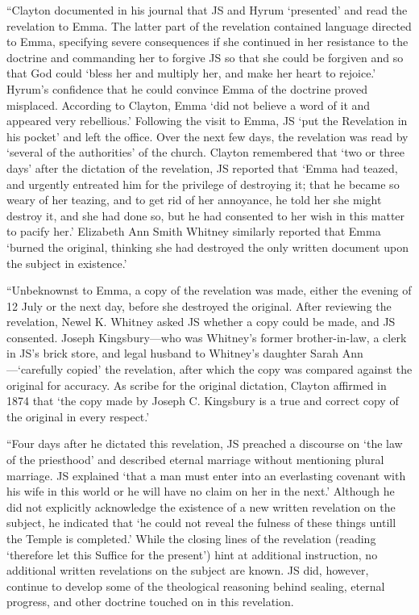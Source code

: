 			``Clayton documented in his journal that JS and Hyrum `presented' and read the revelation to Emma. The latter part of the revelation contained language directed to Emma, specifying severe consequences if she continued in her resistance to the doctrine and commanding her to forgive JS so that she could be forgiven and so that God could `bless her and multiply her, and make her heart to rejoice.' Hyrum's confidence that he could convince Emma of the doctrine proved misplaced. According to Clayton, Emma `did not believe a word of it and appeared very rebellious.' Following the visit to Emma, JS `put the Revelation in his pocket' and left the office. Over the next few days, the revelation was read by `several of the authorities' of the church. Clayton remembered that `two or three days' after the dictation of the revelation, JS reported that `Emma had teazed, and urgently entreated him for the privilege of destroying it; that he became so weary of her teazing, and to get rid of her annoyance, he told her she might destroy it, and she had done so, but he had consented to her wish in this matter to pacify her.' Elizabeth Ann Smith Whitney similarly reported that Emma `burned the original, thinking she had destroyed the only written document upon the subject in existence.'

			``Unbeknownst to Emma, a copy of the revelation was made, either the evening of 12 July or the next day, before she destroyed the original. After reviewing the revelation, Newel K. Whitney asked JS whether a copy could be made, and JS consented. Joseph Kingsbury---who was Whitney's former brother-in-law, a clerk in JS's brick store, and legal husband to Whitney's daughter Sarah Ann---`carefully copied' the revelation, after which the copy was compared against the original for accuracy. As scribe for the original dictation, Clayton affirmed in 1874 that `the copy made by Joseph C. Kingsbury is a true and correct copy of the original in every respect.'

			``Four days after he dictated this revelation, JS preached a discourse on `the law of the priesthood' and described eternal marriage without mentioning plural marriage. JS explained `that a man must enter into an everlasting covenant with his wife in this world or he will have no claim on her in the next.' Although he did not explicitly acknowledge the existence of a new written revelation on the subject, he indicated that `he could not reveal the fulness of these things untill the Temple is completed.' While the closing lines of the revelation (reading `therefore let this Suffice for the present') hint at additional instruction, no additional written revelations on the subject are known. JS did, however, continue to develop some of the theological reasoning behind sealing, eternal progress, and other doctrine touched on in this revelation.


